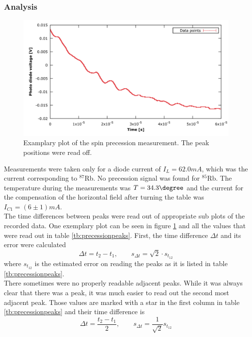 \subsubsection{Analysis}
\begin{figure}
	\centering
	\includegraphics[width=1.0\linewidth]{graphics/spinprecessionexample}
	\caption[Example spin precession]{Examplary plot of the spin precession measurement. The peak positions were read off.}
	\label{fig:spinprecessionexample}
\end{figure}
Measurements were taken only for a diode current of $I_L=\unit{62.0}{mA}$, which was the current corresponding to $^{87}$Rb. No precession signal was found for $^{85}$Rb. The temperature during the measurements was $T=\unit{34.3}{\degree}$ and the current for the compensation of the horizontal field after turning the table was $I_{C1}=\unit{(6\pm1)}{mA}$.\\
The time differences between peaks were read out of appropriate sub plots of the recorded data. One exemplary plot can be seen in figure \ref{fig:spinprecessionexample} and all the values that were read out in table \ref{tb:precessionpeaks}. First, the time difference $\Delta t$ and its error were calculated
\begin{equation}
\Delta t=t_2-t_1, \qquad s_{\Delta t}=\sqrt{2}\cdot s_{t_{12}}
\end{equation}
where $s_{t_{12}}$ is the estimated error on reading the peaks as it is listed in table \ref{tb:precessionpeaks}.\\
There sometimes were no properly readable adjacent peaks. While it was always clear that there was a peak, it was much easier to read out the second most adjacent peak. Those values are marked with a star in the first column in table \ref{tb:precessionpeaks} and their time difference is
\begin{equation}
\Delta t=\frac{t_2-t_1}{2},\qquad s_{\Delta t}=\frac{1}{\sqrt{2}}s_{t_{12}}
\end{equation}

